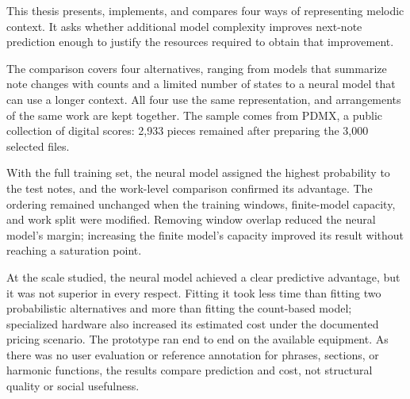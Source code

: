 This thesis presents, implements, and compares four ways of representing melodic context. It asks whether additional model complexity improves next-note prediction enough to justify the resources required to obtain that improvement.

The comparison covers four alternatives, ranging from models that summarize note changes with counts and a limited number of states to a neural model that can use a longer context. All four use the same representation, and arrangements of the same work are kept together. The sample comes from PDMX, a public collection of digital scores: 2,933 pieces remained after preparing the 3,000 selected files.

With the full training set, the neural model assigned the highest probability to the test notes, and the work-level comparison confirmed its advantage. The ordering remained unchanged when the training windows, finite-model capacity, and work split were modified. Removing window overlap reduced the neural model's margin; increasing the finite model's capacity improved its result without reaching a saturation point.

At the scale studied, the neural model achieved a clear predictive advantage, but it was not superior in every respect. Fitting it took less time than fitting two probabilistic alternatives and more than fitting the count-based model; specialized hardware also increased its estimated cost under the documented pricing scenario. The prototype ran end to end on the available equipment. As there was no user evaluation or reference annotation for phrases, sections, or harmonic functions, the results compare prediction and cost, not structural quality or social usefulness.

